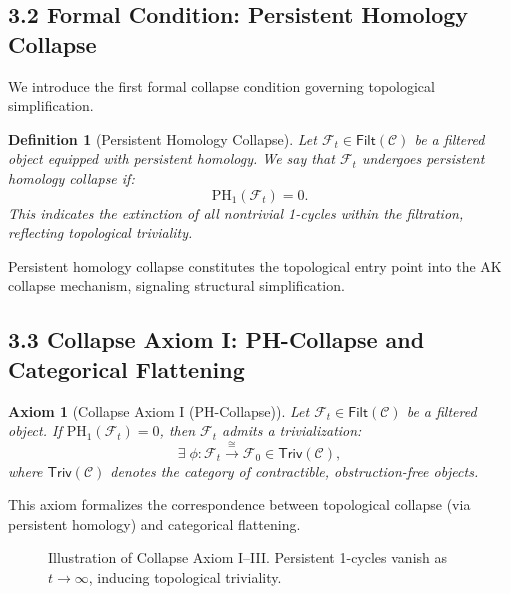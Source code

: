 \documentclass[11pt]{article}
\newtheorem{definition}[theorem]{Definition}
\newtheorem{axiom}{Axiom}[section]
\begin{document}
\subsection*{3.2 Formal Condition: Persistent Homology Collapse}

We introduce the first formal collapse condition governing topological simplification.

\begin{definition}[Persistent Homology Collapse]
Let \( \mathcal{F}_t \in \mathsf{Filt}(\mathcal{C}) \) be a filtered object equipped with persistent homology.  
We say that \( \mathcal{F}_t \) undergoes \emph{persistent homology collapse} if:
\[
\mathrm{PH}_1(\mathcal{F}_t) = 0.
\]
This indicates the extinction of all nontrivial 1-cycles within the filtration, reflecting topological triviality.
\end{definition}

Persistent homology collapse constitutes the topological entry point into the AK collapse mechanism, signaling structural simplification.

\subsection*{3.3 Collapse Axiom I: PH-Collapse and Categorical Flattening}

\begin{axiom}[Collapse Axiom I (PH-Collapse)]
Let \( \mathcal{F}_t \in \mathsf{Filt}(\mathcal{C}) \) be a filtered object.  
If \( \mathrm{PH}_1(\mathcal{F}_t) = 0 \), then \( \mathcal{F}_t \) admits a trivialization:
\[
\exists \; \phi: \mathcal{F}_t \overset{\cong}{\longrightarrow} \mathcal{F}_0 \in \mathsf{Triv}(\mathcal{C}),
\]
where \( \mathsf{Triv}(\mathcal{C}) \) denotes the category of contractible, obstruction-free objects.
\end{axiom}

This axiom formalizes the correspondence between topological collapse (via persistent homology) and categorical flattening.

\begin{figure}[h]
\centering
{}
\caption{Illustration of Collapse Axiom I–III. Persistent 1-cycles vanish as $t \to \infty$, inducing topological triviality.}
\end{figure}
\end{document}
